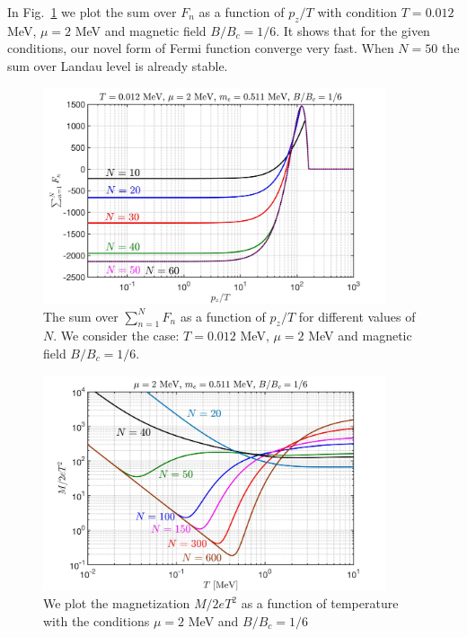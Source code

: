 \documentclass[sn-mathphys,Numbered]{sn-jnl}
\begin{document}
In Fig.~\ref{Fn_Checking} we plot the sum over $F_n$ as a function of $p_z/T$ with condition $T=0.012$ MeV, $\mu=2$ MeV and magnetic field $B/B_c=1/6$. It shows that for the given conditions, our novel form of Fermi function converge very fast. When $N=50$ the sum over Landau level is already stable.
\begin{figure}[ht]
\begin{center}
\includegraphics[width=0.9\textwidth]{./plot/NewFermi_SumChecking}
\caption{The sum over  $\sum_{n=1}^NF_n$ as a function of $p_z/T$ for different values of $N$. We consider the case: $T=0.012$ MeV, $\mu=2$ MeV and magnetic field $B/B_c=1/6$.}
\label{Fn_Checking}
\end{center}
\end{figure}
\begin{figure}[ht]
\begin{center}
\includegraphics[width=0.9\textwidth]{./plot/NewFermi_Magnetization_tot003}
\caption{We plot the magnetization $M/2eT^2$ as a function of temperature with the conditions $\mu=2$ MeV and $B/B_c=1/6$}
\label{M_Checking}
\end{center}
\end{figure}
\end{document}
